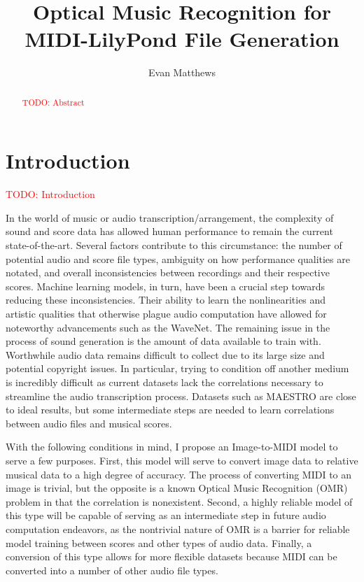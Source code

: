 \documentclass[review,sigconf]{acmart}
\newcommand{\todo}[1]{\textcolor{red}{TODO: #1}}
\begin{document}
\title[omr-lilypond-midi]{Optical Music Recognition for MIDI-LilyPond File Generation}
\author{Evan Matthews}

\begin{abstract}
\todo{Abstract}
\end{abstract}

\maketitle

\section{Introduction}
\todo{Introduction}

In the world of music or audio transcription/arrangement, the complexity of sound and score data has allowed human performance to remain the current state-of-the-art. Several factors contribute to this circumstance: the number of potential audio and score file types, ambiguity on how performance qualities are notated, and overall inconsistencies between recordings and their respective scores. Machine learning models, in turn, have been a crucial step towards reducing these inconsistencies. Their ability to learn the nonlinearities and artistic qualities that otherwise plague audio computation have allowed for noteworthy advancements such as the WaveNet\cite{oord2016wavenet}. The remaining issue in the process of sound generation is the amount of data available to train with. Worthwhile audio data remains difficult to collect due to its large size and potential copyright issues. In particular, trying to condition off another medium is incredibly difficult as current datasets lack the correlations necessary to streamline the audio transcription process. Datasets such as MAESTRO are close to ideal results, but some intermediate steps are needed to learn correlations between audio files and musical scores.

With the following conditions in mind, I propose an Image-to-MIDI model to serve a few purposes. First, this model will serve to convert image data to relative musical data to a high degree of accuracy. The process of converting MIDI to an image is trivial, but the opposite is a known Optical Music Recognition (OMR) problem in that the correlation is nonexistent. Second, a highly reliable model of this type will be capable of serving as an intermediate step in future audio computation endeavors, as the nontrivial nature of OMR is a barrier for reliable model training between scores and other types of audio data. Finally, a conversion of this type allows for more flexible datasets because MIDI can be converted into a number of other audio file types.
\end{document}
